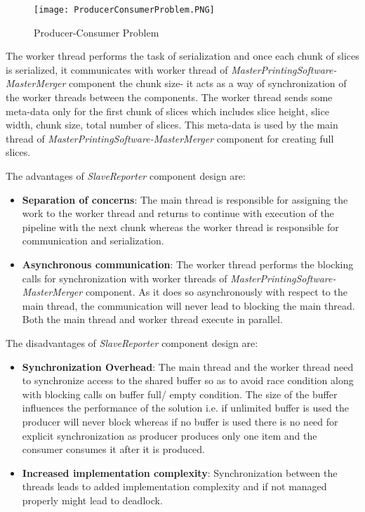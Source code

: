 \begin{figure}[t]
\centering
\texttt{[image: ProducerConsumerProblem.PNG]}
\caption{Producer-Consumer Problem}
\label{fig:ProducerConsumerProblem}
\end{figure}

The worker thread performs the task of serialization and once each chunk of slices is serialized, it communicates with worker thread of \textit{MasterPrintingSoftware-MasterMerger} component the chunk size- it acts as a way of synchronization of the worker threads between the components. The worker thread sends some meta-data  only for the first chunk of slices which includes slice height, slice width, chunk size, total number of slices. This meta-data is used by the main thread of \textit{MasterPrintingSoftware-MasterMerger} component for creating full slices.\newline

The advantages of \textit{SlaveReporter} component design are:
\begin{itemize}
\item \textbf{Separation of concerns}: The main thread is responsible for assigning the work to the worker thread and returns to continue with execution of the pipeline with the next chunk whereas the worker thread is responsible for communication and serialization.  
\item \textbf{Asynchronous communication}: The worker thread performs the blocking calls for synchronization with worker threads of \textit{MasterPrintingSoftware-MasterMerger} component. As it does so asynchronously with respect to the main thread, the communication will never lead to blocking the main thread. Both the main thread and worker thread execute in parallel.
\end{itemize} 

The disadvantages of \textit{SlaveReporter} component design are:
\begin{itemize}
\item \textbf{Synchronization Overhead}: The main thread and the worker thread need to synchronize access to the shared buffer so as to avoid race condition along with blocking calls on buffer full/ empty condition. The size of the buffer influences the performance of the solution i.e. if unlimited buffer is used the producer will never block whereas if no buffer is used there is no need for explicit synchronization as producer produces only one item and the consumer consumes it after it is produced.
\item \textbf{Increased implementation complexity}: Synchronization between the threads leads to added implementation complexity and if not managed properly might lead to deadlock. 
\end{itemize} 

